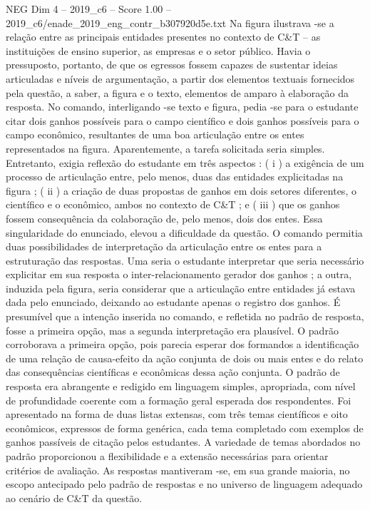 \begin{textsample}{NEG Dim 4 – 2019\_c6 – Score 1.00 – 2019\_c6/enade\_2019\_eng\_contr\_b307920d5e.txt}
Na figura ilustrava -se a relação entre as principais entidades presentes no contexto de C\&T – as instituições de ensino superior, as empresas e o setor público.
Havia o pressuposto, portanto, de que os egressos fossem capazes de sustentar ideias articuladas e níveis de argumentação, a partir dos elementos textuais fornecidos pela questão, a saber, a figura e o texto, elementos de amparo à elaboração da resposta.
No comando, interligando -se texto e figura, pedia -se para o estudante citar dois ganhos possíveis para o campo científico e dois ganhos possíveis para o campo econômico, resultantes de uma boa articulação entre os entes representados na figura.
Aparentemente, a tarefa solicitada seria simples.
Entretanto, exigia reflexão do estudante em três aspectos : ( i ) a exigência de um processo de articulação entre, pelo menos, duas das entidades explicitadas na figura ; ( ii ) a criação de duas propostas de ganhos em dois setores diferentes, o científico e o econômico, ambos no contexto de C\&T ; e ( iii ) que os ganhos fossem consequência da colaboração de, pelo menos, dois dos entes.
Essa singularidade do enunciado, elevou a dificuldade da questão.
O comando permitia duas possibilidades de interpretação da articulação entre os entes para a estruturação das respostas.
Uma seria o estudante interpretar que seria necessário explicitar em sua resposta o inter-relacionamento gerador dos ganhos ; a outra, induzida pela figura, seria considerar que a articulação entre entidades já estava dada pelo enunciado, deixando ao estudante apenas o registro dos ganhos.
É presumível que a intenção inserida no comando, e refletida no padrão de resposta, fosse a primeira opção, mas a segunda interpretação era plausível.
O padrão corroborava a primeira opção, pois parecia esperar dos formandos a identificação de uma relação de causa-efeito da ação conjunta de dois ou mais entes e do relato das consequências científicas e econômicas dessa ação conjunta.
O padrão de resposta era abrangente e redigido em linguagem simples, apropriada, com nível de profundidade coerente com a formação geral esperada dos respondentes.
Foi apresentado na forma de duas listas extensas, com três temas científicos e oito econômicos, expressos de forma genérica, cada tema completado com exemplos de ganhos passíveis de citação pelos estudantes.
A variedade de temas abordados no padrão proporcionou a flexibilidade e a extensão necessárias para orientar critérios de avaliação.
As respostas mantiveram -se, em sua grande maioria, no escopo antecipado pelo padrão de respostas e no universo de linguagem adequado ao cenário de C\&T da questão.

\end{textsample}
